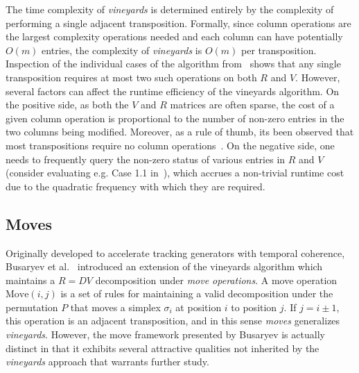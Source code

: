 \documentclass[sn-mathphys]{sn-jnl}
\begin{document}
 The time complexity of \emph{vineyards} is determined entirely by the complexity of performing a single adjacent transposition.
Formally, since column operations are the largest complexity operations needed and each column can have potentially $O(m)$ entries, the complexity of \emph{vineyards} is $O(m)$ per transposition. 
Inspection of the individual cases of the algorithm from~\cite{cohen2006vines} shows that any single transposition requires at most two such operations on both $R$ and $V$.
However, several factors can affect the runtime efficiency of the vineyards algorithm. 
On the positive side, as both the $V$ and $R$ matrices are often sparse, the cost of a given column operation is proportional to the number of non-zero  entries in the two columns being modified. Moreover, as a rule of thumb, its been observed that most transpositions require no column operations~\cite{edelsbrunner2000topological}. 
On the negative side, one needs to frequently query the non-zero status of various entries in $R$ and $V$ (consider evaluating e.g. Case 1.1 in~\cite{cohen2006vines}), which accrues a non-trivial runtime cost due to the quadratic frequency with which they are required.   
 

\subsection{Moves}\label{sec:moves} Originally developed to accelerate tracking generators with temporal coherence, Busaryev et al.~\cite{busaryev2010tracking} introduced an extension of the vineyards algorithm which maintains a $R = D V$ decomposition under \emph{move operations}. A move operation $\mathrm{Move}(i,j)$ is a set of rules for maintaining a valid decomposition under the permutation $P$ that moves a simplex $\sigma_i$ at position $i$ to position $j$. If $j = i \pm 1$, this operation is an adjacent transposition, and in this sense \emph{moves} generalizes \emph{vineyards}.
However, the move framework presented by Busaryev is actually distinct in that it exhibits several attractive qualities not inherited by the \emph{vineyards} approach that warrants further study.  
\end{document}
